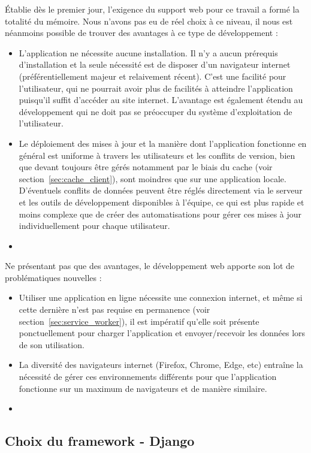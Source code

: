 \documentclass{EPL-master-thesis-covers-FR}
\begin{document}
				\'Etablie dès le premier jour, l'exigence du support web pour ce travail a formé la totalité du mémoire. Nous n'avons pas eu de réel choix à ce niveau, il nous est néanmoins possible de trouver des avantages à ce type de développement :
				\begin{itemize}
					\item L'application ne nécessite aucune installation. Il n'y a aucun prérequis d'installation et la seule nécessité est de disposer d'un navigateur internet (préférentiellement majeur et relaivement récent). C'est une facilité pour l'utilisateur, qui ne pourrait avoir plus de facilités à atteindre l'application puisqu'il suffit d'accéder au site internet. L'avantage est également étendu au développement qui ne doit pas se préoccuper du système d'exploitation de l'utilisateur.
					\item Le déploiement des mises à jour et la manière dont l'application fonctionne en général est uniforme à travers les utilisateurs et les conflits de version, bien que devant toujours être gérés notamment par le biais du cache (voir section~\ref{sec:cache_client}), sont moindres que sur une application locale. D'éventuels conflits de données peuvent être réglés directement via le serveur et les outils de développement disponibles à l'équipe, ce qui est plus rapide et moins complexe que de créer des automatisations pour gérer ces mises à jour individuellement pour chaque utilisateur.
					\item
				\end{itemize}

				Ne présentant pas que des avantages, le développement web apporte son lot de problématiques nouvelles :
				\begin{itemize}
					\item Utiliser une application en ligne nécessite une connexion internet, et même si cette dernière n'est pas requise en permanence (voir section~\ref{sec:service_worker}), il est impératif qu'elle soit présente ponctuellement pour charger l'application et envoyer/recevoir les données lors de son utilisation.
					\item La diversité des navigateurs internet (Firefox, Chrome, Edge, etc) entraîne la nécessité de gérer ces environnements différents pour que l'application fonctionne sur un maximum de navigateurs et de manière similaire.
					\item
				\end{itemize}

			\subsection*{Choix du framework - Django}
\end{document}
